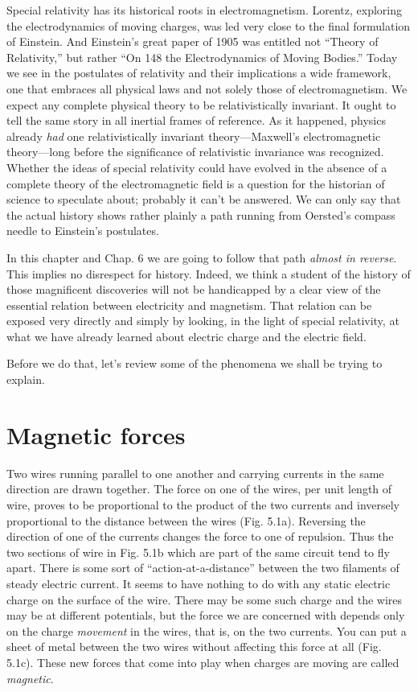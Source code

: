 Special relativity has its historical roots in electromagnetism.
Lorentz, exploring the electrodynamics of moving charges, was led
very close to the final formulation of Einstein. And Einstein's great
paper of 1905 was entitled not ``Theory of Relativity,'' but rather ``On
148
the Electrodynamics of Moving Bodies.'' Today we see in the
postulates of relativity and their implications a wide framework, one
that embraces all physical laws and not solely those of electromagnetism.
We expect any complete physical theory to be relativistically
invariant. It ought to tell the same story in all inertial frames of
reference. As it happened, physics already \emph{had} one relativistically
invariant theory---Maxwell's electromagnetic theory---long before
the significance of relativistic invariance was recognized. Whether
the ideas of special relativity could have evolved in the absence of a
complete theory of the electromagnetic field is a question for the
historian of science to speculate about; probably it can't be answered.
We can only say that the actual history shows rather plainly a path
running from Oersted's compass needle to Einstein's postulates.

In this chapter and Chap. 6 we are going to follow that path \emph{almost
in reverse}. This implies no disrespect for history. Indeed, we think
a student of the history of those magnificent discoveries will not be
handicapped by a clear view of the essential relation between electricity
and magnetism. That relation can be exposed very directly
and simply by looking, in the light of special relativity, at what we
have already learned about electric charge and the electric field.

Before we do that, let's review some of the phenomena we shall be
trying to explain.

\section{Magnetic forces}

Two wires running parallel to one another and carrying currents
in the same direction are drawn together. The force on one of the
wires, per unit length of wire, proves to be proportional to the product
of the two currents and inversely proportional to the distance between
the wires (Fig. 5.1a). Reversing the direction of one of the
currents changes the force to one of repulsion. Thus the two sections
of wire in Fig. 5.1b which are part of the same circuit tend to fly apart.
There is some sort of ``action-at-a-distance'' between the two filaments
of steady electric current. It seems to have nothing to do with
any static electric charge on the surface of the wire. There may be
some such charge and the wires may be at different potentials, but
the force we are concerned with depends only on the charge \emph{movement}
in the wires, that is, on the two currents. You can put a sheet
of metal between the two wires without affecting this force at all
(Fig. 5.1c). These new forces that come into play when charges are
moving are called \emph{magnetic}.

